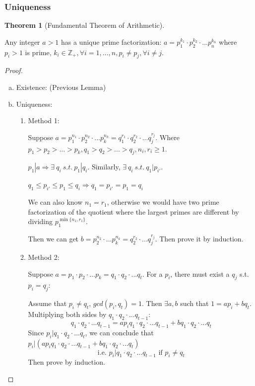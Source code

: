 \documentclass[11pt,a4paper]{article}
\newtheorem{theorem}{Theorem}
\begin{document}
\subsubsection{Uniqueness}
\begin{theorem}[Fundamental Theorem of Arithmetic]
\end{theorem}
Any integer
$a > 1$ has a unique prime factorization:
$a=p_1^{k_1}\cdot p_2^{k_2}\cdot...p_n^{k_n}$ where $p_i > 1$ is prime, $k_i\in\mathbb{Z}_+,\forall i=1,...,n, p_i\neq p_j, \forall i\neq j$.
\begin{proof}
\quad

\begin{enumerate}[a)]
    \item Existence: (Previous Lemma)
    \item Uniqueness: \begin{enumerate}[1)]
        \item Method 1:
        
        Suppose $a=p_1^{n_1}\cdot p_2^{n_2}\cdot...p_k^{n_k}=q_1^{r_1}\cdot q_2^{r_2}\cdot...q_j^{r_j}$. Where $p_1>p_2>...>p_k, q_1>q_2>...>q_j, n_i,r_i\geq 1$.

        $p_1|a\Rightarrow \exists\ q_i\ s.t.\ p_1|q_i$. Similarly, $\exists\ q_i\ s.t.\ q_1|p_{i'}$.
        
        $q_1\leq p_{i'}\leq p_1\leq q_i\Rightarrow q_1= p_{i'}= p_1= q_i$
        
        We can also know $n_1=r_1$, otherwise we would have two prime factorization of the quotient where the largest primes are different by dividing $p_1^{\min\{n_1,r_1\}}$.
        
        Then we can get $b=p_2^{n_2}\cdot...p_k^{n_k}=q_2^{r_2}\cdot...q_j^{r_j}$. Then prove it by induction.

        \item Method 2:
        
        Suppose $a=p_1\cdot p_2\cdot...p_k=q_1\cdot q_2\cdot...q_t$. For a $p_i$, there must exist a $q_j$ s.t. $p_i=q_j$:

        Assume that $p_i\neq q_t$, $gcd(p_i,q_t)=1$. Then $\exists a,b$ such that $1=ap_i+bq_t$. Multiplying both sides by $q_1\cdot q_2\cdot...q_{t-1}$: $$q_1\cdot q_2\cdot...q_{t-1}=ap_iq_1\cdot q_2\cdot...q_{t-1}+bq_1\cdot q_2\cdot...q_t$$
        Since $p_i|q_1\cdot q_2\cdot...q_t$, we can conclude that $p_i|(ap_iq_1\cdot q_2\cdot...q_{t-1}+bq_1\cdot q_2\cdot...q_t)$ $$\text{i.e. } p_i|q_1\cdot q_2\cdot...q_{t-1}\text{ if }p_i\neq q_t$$
        Then prove by induction.
    \end{enumerate}
\end{enumerate}
\end{proof}
\end{document}
